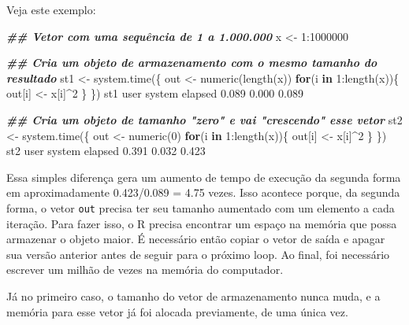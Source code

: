 \documentclass[
  10pt,
  a4paper]{book}
\newenvironment{Shaded}{\begin{snugshade}}{\end{snugshade}}
\newcommand{\ControlFlowTok}[1]{\textcolor[rgb]{0.13,0.29,0.53}{\textbf{#1}}}
\newcommand{\DecValTok}[1]{\textcolor[rgb]{0.00,0.00,0.81}{#1}}
\newcommand{\DocumentationTok}[1]{\textcolor[rgb]{0.56,0.35,0.01}{\textbf{\textit{#1}}}}
\newcommand{\FloatTok}[1]{\textcolor[rgb]{0.00,0.00,0.81}{#1}}
\newcommand{\FunctionTok}[1]{\textcolor[rgb]{0.00,0.00,0.00}{#1}}
\newcommand{\NormalTok}[1]{#1}
\newcommand{\OtherTok}[1]{\textcolor[rgb]{0.56,0.35,0.01}{#1}}
\newcommand{\SpecialCharTok}[1]{\textcolor[rgb]{0.00,0.00,0.00}{#1}}
\begin{document}
Veja este exemplo:

\begin{Shaded}
\begin{Highlighting}[]
\DocumentationTok{\#\# Vetor com uma sequência de 1 a 1.000.000}
\NormalTok{x }\OtherTok{\textless{}{-}} \DecValTok{1}\SpecialCharTok{:}\DecValTok{1000000}

\DocumentationTok{\#\# Cria um objeto de armazenamento com o mesmo tamanho do resultado}
\NormalTok{st1 }\OtherTok{\textless{}{-}} \FunctionTok{system.time}\NormalTok{(\{}
\NormalTok{    out }\OtherTok{\textless{}{-}} \FunctionTok{numeric}\NormalTok{(}\FunctionTok{length}\NormalTok{(x))}
    \ControlFlowTok{for}\NormalTok{(i }\ControlFlowTok{in} \DecValTok{1}\SpecialCharTok{:}\FunctionTok{length}\NormalTok{(x))\{}
\NormalTok{        out[i] }\OtherTok{\textless{}{-}}\NormalTok{ x[i]}\SpecialCharTok{\^{}}\DecValTok{2}
\NormalTok{    \}}
\NormalTok{\})}
\NormalTok{st1}
\NormalTok{   user  system elapsed }
  \FloatTok{0.089}   \FloatTok{0.000}   \FloatTok{0.089} 

\DocumentationTok{\#\# Cria um objeto de tamanho "zero" e vai "crescendo" esse vetor}
\NormalTok{st2 }\OtherTok{\textless{}{-}} \FunctionTok{system.time}\NormalTok{(\{}
\NormalTok{    out }\OtherTok{\textless{}{-}} \FunctionTok{numeric}\NormalTok{(}\DecValTok{0}\NormalTok{)}
    \ControlFlowTok{for}\NormalTok{(i }\ControlFlowTok{in} \DecValTok{1}\SpecialCharTok{:}\FunctionTok{length}\NormalTok{(x))\{}
\NormalTok{        out[i] }\OtherTok{\textless{}{-}}\NormalTok{ x[i]}\SpecialCharTok{\^{}}\DecValTok{2}
\NormalTok{    \}}
\NormalTok{\})}
\NormalTok{st2}
\NormalTok{   user  system elapsed }
  \FloatTok{0.391}   \FloatTok{0.032}   \FloatTok{0.423} 
\end{Highlighting}
\end{Shaded}

Essa simples diferença gera um aumento de tempo de execução da segunda
forma em aproximadamente
0.423/0.089 = 4.75 vezes. Isso acontece
porque, da segunda forma, o vetor \texttt{out} precisa ter seu tamanho
aumentado com um elemento a cada iteração. Para fazer isso, o R precisa
encontrar um espaço na memória que possa armazenar o objeto maior. É
necessário então copiar o vetor de saída e apagar sua versão anterior
antes de seguir para o próximo loop. Ao final, foi necessário escrever
um milhão de vezes na memória do computador.

Já no primeiro caso, o tamanho do vetor de armazenamento nunca muda, e a
memória para esse vetor já foi alocada previamente, de uma única vez.
\end{document}
